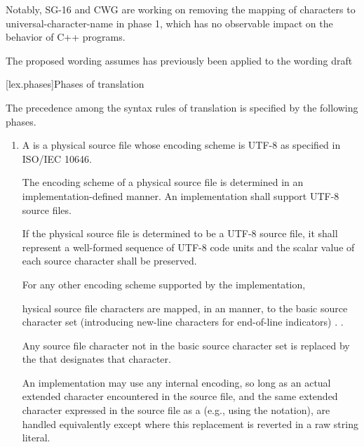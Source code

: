 \documentclass{wg21}
\begin{document}
Notably, SG-16 and CWG are working on removing the mapping of characters to universal-character-name in phase 1, which has no observable impact on the behavior of C++ programs.

The proposed wording assumes  has previously been applied to the wording draft


[lex.phases]{Phases of translation}%

\pnum
{}%
The precedence among the syntax rules of translation is specified by the
following phases.

\begin{enumerate}
    \item

\begin{addedblock}
     A  is a physical source file whose encoding scheme is UTF-8 as specified in ISO/IEC 10646.
    
    The encoding scheme of a physical source file is determined in an implementation-defined manner. An implementation shall support UTF-8 source files.
    
    If the physical source file is determined to be a UTF-8 source file, it shall represent a well-formed sequence of UTF-8 code units and the scalar value of each source character shall be preserved.   
    
    For any other encoding scheme supported by the implementation,
\end{addedblock}hysical source file characters are mapped, in an
 manner,
to the basic source character set (introducing new-line characters for end-of-line
indicators) .
.


Any source file character not in the basic source character set is replaced by the  that
designates that character.

An implementation may use any internal
encoding, so long as an actual extended character encountered in the
source file, and the same extended character expressed in the source
file as a  (e.g., using the  notation), are handled equivalently except where this replacement is reverted in a raw string literal.


\end{enumerate}
\end{document}
